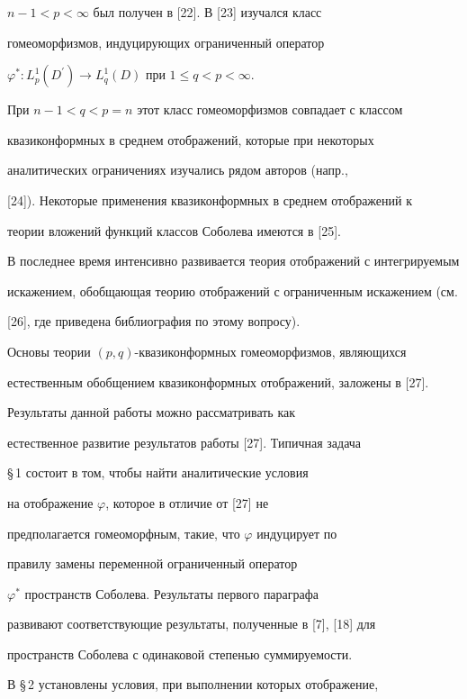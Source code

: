 $n-1<p<\infty$ был получен в [22]. В [23] изучался класс


гомеоморфизмов, индуцирующих ограниченный оператор


$\varphi^*:L^1_p(D^{\prime})\to L^1_q(D)$ при $1\leq q<p<\infty$.


При $n-1<q<p=n$ этот класс гомеоморфизмов совпадает с классом


квазиконформных в среднем отображений, которые при некоторых


аналитических ограничениях изучались рядом авторов (напр.,


[24]). Некоторые применения квазиконформных в среднем отображений к


теории вложений функций классов Соболева имеются в [25].





В последнее время интенсивно развивается теория отображений с интегрируемым


искажением, обобщающая теорию отображений с ограниченным искажением (см.


[26], где приведена библиография по этому вопросу).





Основы теории $(p,q)$-квазиконформных гомеоморфизмов, являющихся


естественным обобщением квазиконформных отображений, заложены в [27].





Результаты данной работы можно рассматривать как


естественное развитие результатов работы [27]. Типичная задача


\S\,1 состоит в том, чтобы найти аналитические условия


на отображение $\varphi$, которое в отличие от [27] не


предполагается гомеоморфным, такие, что $\varphi$ индуцирует по


правилу замены переменной ограниченный оператор


$\varphi^*$ пространств Соболева. Результаты первого параграфа


развивают соответствующие результаты, полученные в [7], [18] для


пространств Соболева с одинаковой степенью суммируемости.


В \S\,2 установлены условия, при выполнении которых отображение,


